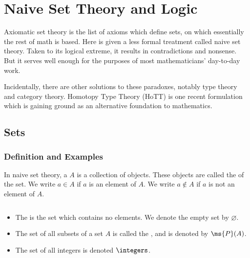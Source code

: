 \chapter{Naive Set Theory and Logic}

Axiomatic set theory is the list of axioms which define sets, on 
which essentially the rest of math is based. Here is given a less 
formal treatment called naive set theory. Taken to its logical 
extreme, it results in contradictions and nonsense. But it serves 
well enough for the purposes of most mathematicians' day-to-day 
work.

Incidentally, there are other solutions to these paradoxes, notably 
type theory and category theory. Homotopy Type Theory (HoTT) is one 
recent formulation which is gaining ground as an alternative 
foundation to mathematics.


\newpage

\section{Sets}

\subsection{Definition and Examples}\label{sets}

\begin{definition}
	In naive set theory, a  $A$ is a collection 
	of objects. These objects are called the 
	 of the set. We write $a 
	\in A$ if $a$ is an element of $A$. We write $a \notin A$ if 
	$a$ is not an element of $A$.
\end{definition}

\begin{example}
	$ $
	\begin{itemize}
		\item The  is the set 
		which contains no elements. We denote the empty set by 
		$\varnothing$.
		
		\item The set of all subsets of a set $A$ is called the 
		, and is 
		denoted by 
		$\ms{P}(A)$.
		
		\item The set of all integers is denoted $\integers$.
	\end{itemize}
\end{example}

